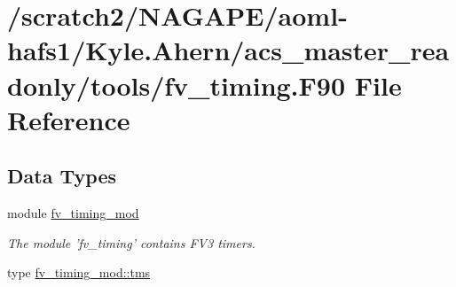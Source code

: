 \section{/scratch2/\-N\-A\-G\-A\-P\-E/aoml-\/hafs1/\-Kyle.Ahern/acs\-\_\-master\-\_\-readonly/tools/fv\-\_\-timing.F90 File Reference}
\label{fv__timing_8F90}
\subsection*{Data Types}
\begin{DoxyCompactItemize}
\item 
module \hyperlink{classfv__timing__mod}{fv\-\_\-timing\-\_\-mod}
\begin{DoxyCompactList}\small\item\em The module 'fv\-\_\-timing' contains F\-V3 timers. \end{DoxyCompactList}\item 
type \hyperlink{structfv__timing__mod_1_1tms}{fv\-\_\-timing\-\_\-mod\-::tms}
\end{DoxyCompactItemize}
